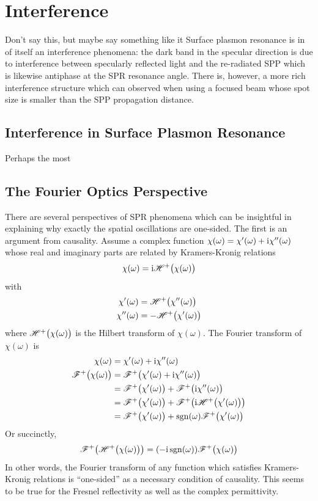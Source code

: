\documentclass[a4paper,titlepage,onecolumn]{report}
\begin{document}
\chapter{Interference}
Don't say this, but maybe say something like it
Surface plasmon resonance is in of itself an interference phenomena: the dark band in the specular direction is due to interference between
specularly reflected light and the re-radiated SPP which is likewise
antiphase at the SPR resonance angle.  There is, however, a more rich 
interference structure which can observed when using a focused beam whose spot size is smaller than the SPP propagation distance.  

\section{Interference in Surface Plasmon Resonance}
Perhaps the most 

\section{The Fourier Optics Perspective}
There are several perspectives of SPR phenomena which can be insightful in
explaining why exactly the spatial oscillations are one-sided.  The first
is an argument from causality.  Assume a complex function $\chi(\omega) =
\chi'(\omega) + {\mathrm{i}} \chi''(\omega)$ whose real and imaginary parts are
related by Kramers-Kronig relations
\begin{align}
\chi(\omega)={\mathrm{i}} {\mathscr{H}^{+}\bigl(\chi(\omega)\bigr)}
\end{align}
with 
\begin{align}
\chi'(\omega) &= {\mathscr{H}^{+}\bigl(\chi''(\omega)\bigr)}\\
\chi''(\omega) &= -{\mathscr{H}^{+}\bigl(\chi'(\omega)\bigr)}
\end{align}
where ${\mathscr{H}^{+}\bigl(\chi(\omega)\bigr)}$ is the Hilbert transform of $\chi(\omega)$.
The Fourier transform of $\chi(\omega)$ is
\begin{align}
\chi(\omega) &= \chi'(\omega) + {\mathrm{i}} \chi''(\omega)\\
{\mathscr{F}^{+}\bigl(\chi(\omega)\bigr)} &= {\mathscr{F}^{+}\bigl(\chi'(\omega) + {\mathrm{i}} \chi''(\omega)\bigr)}\\
&= {\mathscr{F}^{+}\bigl(\chi'(\omega)\bigr)} + {\mathscr{F}^{+}\bigl({\mathrm{i}} \chi''(\omega)\bigr)}\\
&= {\mathscr{F}^{+}\bigl(\chi'(\omega)\bigr)} + {\mathscr{F}^{+}\bigl({\mathrm{i}} {\mathscr{H}^{+}\bigl(\chi'(\omega)\bigr)}\bigr)} \\
&= {\mathscr{F}^{+}\bigl(\chi'(\omega)\bigr)} + \operatorname{sgn}(\omega) {\mathscr{F}^{+}\bigl(\chi'(\omega)\bigr)} \\
\end{align}
Or succinctly,
\begin{align}
{\mathscr{F}^{+}\bigl({\mathscr{H}^{+}\bigl(\chi(\omega)\bigr)}\bigr)} = (-{\mathrm{i}} \operatorname{sgn}(\omega)) {\mathscr{F}^{+}\bigl(\chi(\omega)\bigr)}
\end{align}
In other words, the Fourier transform of any function which satisfies
Kramers-Kronig relations is ``one-sided'' as a necessary
condition of causality.  This seems to be true for the Fresnel
reflectivity as well as the complex permittivity.
\end{document}
